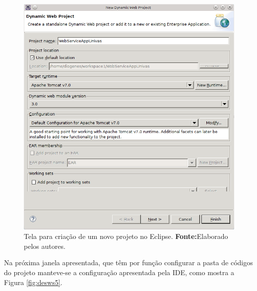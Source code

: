 	\begin{figure}[h!]
		\centerline{\includegraphics[scale=0.8]{./imagens/2_q_metodologico/4_procedimentos_resultados/43_webservice/432_desenvolvimento/desws4.png}}
		\caption[Tela para criação de um novo projeto no Eclipse]{Tela para criação de um novo projeto no Eclipse.
			\textbf{Fonte:}Elaborado pelos autores.}
		\label{fig:desws4}
	\end{figure}
	
	\pagebreak
	
	
	\par Na próxima janela apresentada, que têm por função configurar a pasta de
códigos do projeto manteve-se a configuração apresentada pela IDE, como mostra
a Figura \ref{fig:desws5}.

